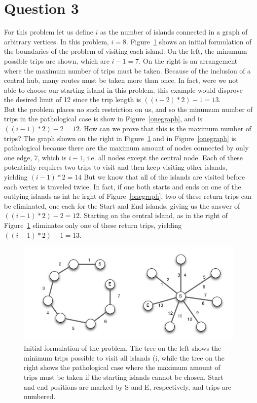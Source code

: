 \documentclass[12pt]{article}
\begin{document}
\clearpage
\section*{Question 3}
For this problem let us define $i$ as the number of islands connected in a graph of arbitrary vertices. In this problem, $i=8$. Figure~\ref{twographs} shows an initial formulation of the boundaries of the problem of visiting each island.  On the left, the minumum possible trips are shown, which are $i-1 =7$.  On the right is an arrangement where the maximum number of trips must be taken.  Because of the inclusion of a central hub, many routes must be taken more than once.  In fact, were we not able to choose our starting island in this problem, this example would disprove the desired limit of 12 since the trip length is $((i-2)*2)-1=13$. \\
But the problem places no such restriction on us, and so the minumum number of trips in the pathological case is show in Figure~\ref{onegraph}, and is $((i-1)*2)-2=12$.  How can we prove that this is the maximum number of trips?  The graph shown on the right in Figure~\ref{twographs} and in Figure~\ref{onegraph} is pathological because there are the maximum amount of nodes connected by only one edge, 7, which is $i-1$, i.e. all nodes except the central node.  Each of these potentially requires two trips to visit and then keep visiting other islands, yielding $(i-1)*2=14$  But we know that all of the islands are visited before each vertex is traveled twice.  In fact, if one both starts and ends on one of the outlying islands as int he irght of Figure~\ref{onegraph}, two of these return trips can be eliminated, one each for the Start and End islands, giving us the answer of $((i-1)*2)-2=12$.  Starting on the central island, as in the right of Figure~\ref{twographs} eliminates only one of these return trips, yielding $((i-1)*2)-1=13$.

\begin{figure}[htb]
	\begin{center}
		\includegraphics[width=4.5in]{twographs.jpg}
	\end{center}
	\caption{Initial formulation of the problem.  The tree on the left shows the minimum trips possible to visit all islands (i, while the tree on the right shows the pathological case where the maximum amount of trips must be taken if the starting islands cannot be chosen.  Start and end positions are marked by S and E, respectively, and trips are numbered.}
	\label{twographs}
\end{figure}
\end{document}
